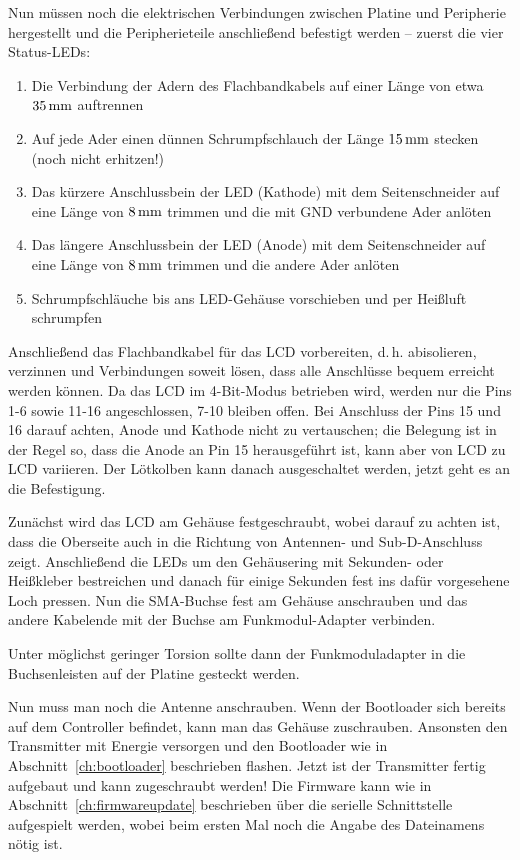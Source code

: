 \documentclass[pdftex, parskip, numbers=noenddot, toc=listof]{scrbook}
\begin{document}
				Nun müssen noch die elektrischen Verbindungen zwischen Platine und Peripherie hergestellt und die Peripherieteile anschließend befestigt werden -- zuerst die vier Status-LEDs:

				\begin{enumerate}\label{enum:leds}
					\item Die Verbindung der Adern des Flachbandkabels auf einer Länge von etwa $\unit[35]{mm}$ auftrennen
					\item Auf jede Ader einen dünnen Schrumpfschlauch der Länge $\unit[15]{mm}$ stecken (noch nicht erhitzen!)
					\item Das kürzere Anschlussbein der LED (Kathode) mit dem Seitenschneider auf eine Länge von $\unit[8]{mm}$ trimmen und die mit GND verbundene Ader anlöten
					\item Das längere Anschlussbein der LED (Anode) mit dem Seitenschneider auf eine Länge von $\unit[8]{mm}$ trimmen und die andere Ader anlöten
					\item Schrumpfschläuche bis ans LED-Gehäuse vorschieben und per Heißluft schrumpfen
				\end{enumerate}

				Anschließend das Flachbandkabel für das LCD vorbereiten, d.\,h. abisolieren, verzinnen und Verbindungen soweit lösen, dass alle Anschlüsse bequem erreicht werden können. Da das LCD im 4-Bit-Modus betrieben wird, werden nur die Pins 1-6 sowie 11-16 angeschlossen, 7-10 bleiben offen. Bei Anschluss der Pins 15 und 16 darauf achten, Anode und Kathode nicht zu vertauschen; die Belegung ist in der Regel so, dass die Anode an Pin 15 herausgeführt ist, kann aber von LCD zu LCD variieren. Der Lötkolben kann danach ausgeschaltet werden, jetzt geht es an die Befestigung.

				Zunächst wird das LCD am Gehäuse festgeschraubt, wobei darauf zu achten ist, dass die Oberseite auch in die Richtung von Antennen- und Sub-D-Anschluss zeigt. Anschließend die LEDs um den Gehäusering mit Sekunden- oder Heißkleber bestreichen und danach für einige Sekunden fest ins dafür vorgesehene Loch pressen. Nun die SMA-Buchse fest am Gehäuse anschrauben und das andere Kabelende mit der Buchse am Funkmodul-Adapter verbinden.

				Unter möglichst geringer Torsion sollte dann der Funkmoduladapter in die Buchsenleisten auf der Platine gesteckt werden.

				Nun muss man noch die Antenne anschrauben. Wenn der Bootloader sich bereits auf dem Controller befindet, kann man das Gehäuse zuschrauben. Ansonsten den Transmitter mit Energie versorgen und den Bootloader wie in Abschnitt~\ref{ch:bootloader} beschrieben flashen. Jetzt ist der Transmitter fertig aufgebaut und kann zugeschraubt werden! Die Firmware kann wie in Abschnitt~\ref{ch:firmwareupdate} beschrieben über die serielle Schnittstelle aufgespielt werden, wobei beim ersten Mal noch die Angabe des Dateinamens nötig ist.
\end{document}
